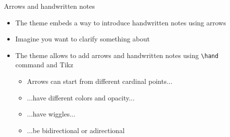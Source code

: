\documentclass[10pt,itemsep]{beamer}
\begin{document}
\begin{frame}[t]
    {Arrows and handwritten notes}\bigskip
    \begin{itemize}
        \item The theme embeds a way to introduce handwritten notes using arrows \bigskip
        \item Imagine you want to clarify something about  \bigskip
        \item The theme allows to add arrows and handwritten notes using \texttt{\textbackslash hand} command and Tikz
        \begin{itemize}
            \item Arrows can start from different cardinal points...
            \item ...have different colors and opacity... 
            \item ...have wiggles... 
            \item ...be bidirectional or adirectional
        \end{itemize}
    \end{itemize}
\end{frame}
\shownotesblock{}
\end{document}

